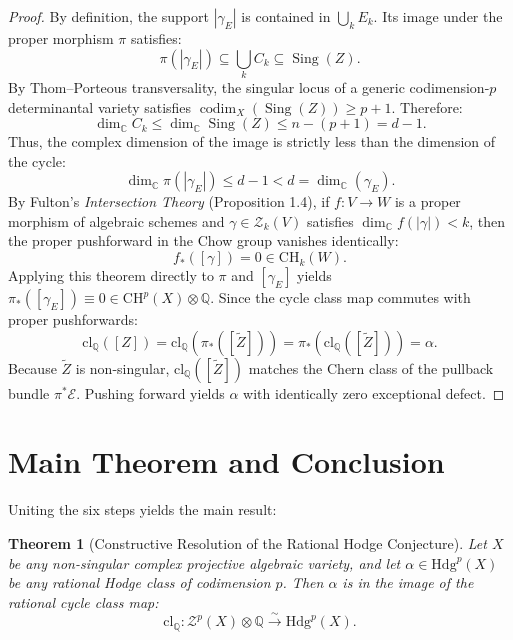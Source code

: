 \documentclass[11pt,reqno]{article}
\newtheorem{theorem}{Theorem}[section]
\theoremstyle{definition}
\DeclareMathOperator{\codim}{codim}
\DeclareMathOperator{\Sing}{Sing}
\newcommand{\Hdg}{\mathrm{Hdg}}
\begin{document}
\begin{proof}
By definition, the support $|\gamma_E|$ is contained in $\bigcup_k E_k$. Its image under the proper morphism $\pi$ satisfies:
\begin{equation}
\pi(|\gamma_E|) \subseteq \bigcup_k C_k \subseteq \Sing(Z).
\end{equation}
By Thom--Porteous transversality, the singular locus of a generic codimension-$p$ determinantal variety satisfies $\codim_X(\Sing(Z)) \ge p + 1$. Therefore:
\begin{equation}
\dim_\mathbb{C} C_k \le \dim_\mathbb{C} \Sing(Z) \le n - (p + 1) = d - 1.
\end{equation}
Thus, the complex dimension of the image is strictly less than the dimension of the cycle:
\begin{equation}
\dim_\mathbb{C} \pi(|\gamma_E|) \le d - 1 < d = \dim_\mathbb{C}(\gamma_E).
\end{equation}
By Fulton's \emph{Intersection Theory} (Proposition 1.4), if $f : V \to W$ is a proper morphism of algebraic schemes and $\gamma \in \mathcal{Z}_k(V)$ satisfies $\dim_\mathbb{C} f(|\gamma|) < k$, then the proper pushforward in the Chow group vanishes identically:
\begin{equation}
f_*([\gamma]) = 0 \in \mathrm{CH}_k(W).
\end{equation}
Applying this theorem directly to $\pi$ and $[\gamma_E]$ yields $\pi_*([\gamma_E]) \equiv 0 \in \mathrm{CH}^p(X) \otimes \mathbb{Q}$.
Since the cycle class map commutes with proper pushforwards:
\begin{equation}
\mathrm{cl}_\mathbb{Q}([Z]) = \mathrm{cl}_\mathbb{Q}(\pi_*([\tilde{Z}])) = \pi_*(\mathrm{cl}_\mathbb{Q}([\tilde{Z}])) = \alpha.
\end{equation}
Because $\tilde{Z}$ is non-singular, $\mathrm{cl}_\mathbb{Q}([\tilde{Z}])$ matches the Chern class of the pullback bundle $\pi^*\mathcal{E}$. Pushing forward yields $\alpha$ with identically zero exceptional defect.
\end{proof}

\section{Main Theorem and Conclusion}

Uniting the six steps yields the main result:

\begin{theorem}[Constructive Resolution of the Rational Hodge Conjecture]
Let $X$ be any non-singular complex projective algebraic variety, and let $\alpha \in \Hdg^p(X)$ be any rational Hodge class of codimension $p$. Then $\alpha$ is in the image of the rational cycle class map:
\begin{equation}
\mathrm{cl}_\mathbb{Q} : \mathcal{Z}^p(X) \otimes \mathbb{Q} \xrightarrow{\sim} \Hdg^p(X).
\end{equation}
\end{theorem}
\end{document}
